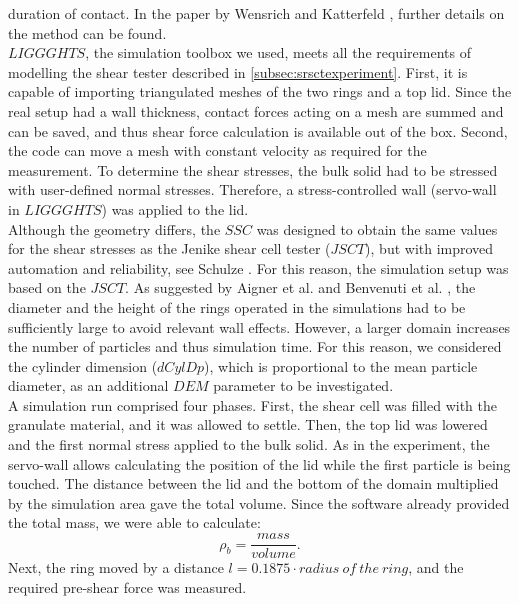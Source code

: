 \documentclass[review]{elsarticle}
\begin{document}
\begin{appendix}
duration of contact.
In the paper by Wensrich and Katterfeld \cite{RefWorks:87}, further details on
the method can be found.\\
$LIGGGHTS$, the simulation toolbox we used, meets all the requirements of
modelling the shear tester described in \ref{subsec:srsctexperiment}. 
First, it is capable of importing triangulated meshes of the two rings and a top lid. 
Since the real setup had a wall thickness, contact forces acting on a mesh are summed and can be saved, 
and thus shear force calculation is available out of the box. 
Second, the code can move a mesh with constant 
velocity as required for the measurement. 
To determine the shear stresses, the bulk solid had to be stressed with 
user-defined normal stresses. 
Therefore, a stress-controlled wall (servo-wall in $LIGGGHTS$) was applied to the lid. \\
Although the geometry differs, the $SSC$ was designed to obtain the same values for the shear stresses as the 
Jenike shear cell tester ($JSCT$), but with improved automation and reliability,
see Schulze \cite{RefWorks:118}. 
For this reason, the simulation setup was
based on the $JSCT$.
As suggested by Aigner et al. \cite{RefWorks:139} and Benvenuti et al. \cite{RefWorks:173}, 
the diameter and the height of the rings operated in the simulations had to be sufficiently large to avoid relevant wall effects. 
However, a larger domain increases the number of particles and thus
simulation time.
For this reason, we considered the cylinder dimension ($dCylDp$), which is
proportional to the mean particle diameter, as an additional $DEM$
parameter to be investigated. \\
A simulation run comprised four phases. 
First, the shear cell was filled with the granulate material, and it was allowed
to settle.
Then, the top lid was lowered and the first normal stress applied to the bulk
solid.
As in the experiment, the servo-wall allows calculating the position of the lid
while the first particle is being touched. 
The distance between the lid and the bottom of the domain multiplied by the 
simulation area gave the total volume.
Since the software already provided the total mass, we were able to calculate:
\begin{equation}
\rho_b = \frac{mass}{volume}.
 \label{eq:rhob}
\end{equation}
Next, the ring moved by a distance $l=0.1875 \cdot radius ~of ~the ~ring$, and
the required pre-shear force was measured.

\end{appendix}
\end{document}
